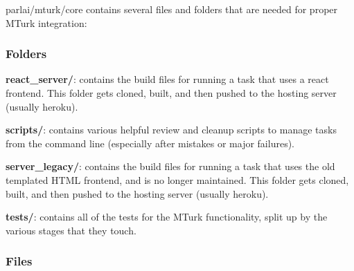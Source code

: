 {\ttfamily parlai/mturk/core} contains several files and folders that are needed for proper M\+Turk integration\+:

\subsubsection*{Folders}


\begin{DoxyItemize}
\item {\bfseries react\+\_\+server/}\+: contains the build files for running a task that uses a react frontend. This folder gets cloned, built, and then pushed to the hosting server (usually heroku).
\item {\bfseries scripts/}\+: contains various helpful review and cleanup scripts to manage tasks from the command line (especially after mistakes or major failures).
\item {\bfseries server\+\_\+legacy/}\+: contains the build files for running a task that uses the old templated H\+T\+ML frontend, and is no longer maintained. This folder gets cloned, built, and then pushed to the hosting server (usually heroku).
\item {\bfseries tests/}\+: contains all of the tests for the M\+Turk functionality, split up by the various stages that they touch.
\end{DoxyItemize}

\subsubsection*{Files}


